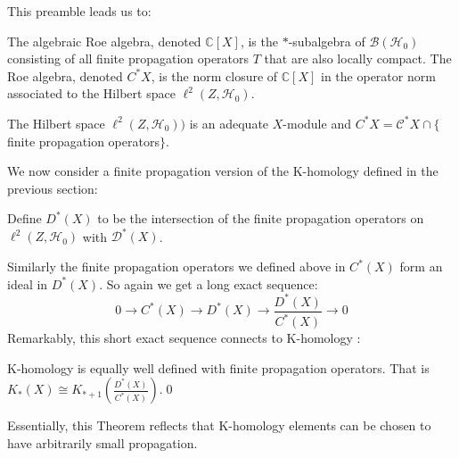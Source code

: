 This preamble leads us to:

\begin{definition}
The algebraic Roe algebra, denoted $\mathbb{C}[X]$, is the $*$-subalgebra of $\mathcal{B}(\mathcal{H}_{0})$ consisting of all finite propagation operators $T$ that are also locally compact. The Roe algebra, denoted $C^{*}X$, is the norm closure of $\mathbb{C}[X]$ in the operator norm associated to the Hilbert space $\ell^{2}(Z,\mathcal{H}_{0})$.
\end{definition}

\begin{remark}
The Hilbert space $\ell^{2}(Z,\mathcal{H}_{0}))$ is an adequate $X$-module \cite{explg1} and $C^{*}X = \mathcal{C}^{*}X \cap \lbrace$finite propagation operators$\rbrace$.
\end{remark}

We now consider a finite propagation version of the K-homology defined in the previous section:

\begin{definition}
Define $D^{*}(X)$ to be the intersection of the finite propagation operators on $\ell^{2}(Z,\mathcal{H}_{0})$ with $\mathcal{D}^{*}(X)$. 
\end{definition}
Similarly the finite propagation operators we defined above in $C^{*}(X)$  form an ideal in $D^{*}(X)$. So again we get a long exact sequence:
\begin{equation*}
0 \rightarrow C^{*}(X) \rightarrow D^{*}(X) \rightarrow \frac{D^{*}(X)}{C^{*}(X)}\rightarrow 0
\end{equation*} 
Remarkably, this short exact sequence connects to K-homology \cite{MR1399087,MR1817560}:
\begin{theorem}\label{Thm:Khom}
K-homology is equally well defined with finite propagation operators. That is $K_{*}(X)\cong K_{*+1}( \frac{D^{*}(X)}{C^{*}(X)})$.\qed
\end{theorem}

Essentially, this Theorem reflects that K-homology elements can be chosen to have arbitrarily small propagation.

